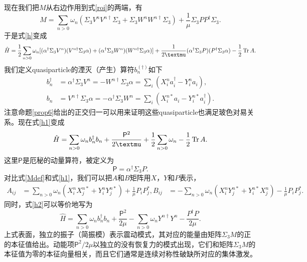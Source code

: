现在我们把$M$从右边作用到式\eqref{roi}的两端，有
\begin{equation}
  M = \sum_{n> 0} \omega_n (\Sigma_3 V^n V^{n\dagger} \Sigma_3 +\Sigma_3 W^n W^{n\dagger} \Sigma_3) +\frac{1}{\mu}\Sigma_3 PP^\dagger \Sigma_3.
\end{equation}
于是式\eqref{h}变成
\begin{equation}
  \hat H=\frac{1}{2}\sum_{n>0} \omega_n [(\alpha^\dagger \Sigma_3 V^n) (V^{n\dagger} \Sigma_3 \alpha )+(\alpha^\dagger \Sigma_3 W^n)(W^{n\dagger}\Sigma_3 \alpha)]+\frac{1}{2\mu}(\alpha^\dagger \Sigma_3 P)(P^\dagger \Sigma_3 \alpha)-\frac{1}{2}\Tr A.\label{h1}
\end{equation}
我们定义quasiparticle的湮灭（产生）算符$b^{(\dagger)}_n$如下
\begin{subequations}
    \begin{align}
        b^\dagger_n &= \alpha^\dagger \Sigma_3 V^n = -W^{n\dagger} \Sigma_3 \alpha = \sum_i (X^n_i a_i^\dagger -Y^n_i a_i),\\
        b_n &= V^{n\dagger}\Sigma_3 \alpha = -\alpha^\dagger \Sigma_3 W^n = \sum_i (X^{n*}_i a_i -Y^{n*}_i a_i^\dagger).
    \end{align}
\end{subequations}
注意命题\ref{prop6}给出的正交归一可以用来证明这些quasiparticle也满足玻色对易关系。现在式\eqref{h1}变成
\begin{equation}
  \hat H=\sum_{n>0} \omega_n b_n^\dagger b_n + \frac{\mathsf P^2}{2\mu}+\frac{1}{2}\sum_{n>0} \omega_n -\frac{1}{2}\Tr A.\label{h2}
\end{equation}
这里$\mathsf P$是厄秘的动量算符，被定义为
\begin{equation}
  \mathsf P=\alpha^\dagger \Sigma_3 P.
\end{equation}
对比式\eqref{Mdef}和式\eqref{h1}，我们可以把$A$和$B$矩阵用$X$，$Y$和$P$表示，
\begin{subequations}
    \begin{align}
        A_{ij} &=\sum_{n>0} \omega_n (X_i^n X_j^{n*} +Y_i^n Y_j^{n*}) +\frac{1}{\mu}P_i P_j^*,
        B_{ij} &= -\sum_{n>0} \omega_n (X_i^n Y_j^{n*} +Y_i^{n*}X_j^n)-\frac{1}{\mu}P_iP_j^*.
    \end{align}
\end{subequations}
同时，式\eqref{h2}可以等价地写为
\begin{equation}
  \hat H=\sum_{n>0} \omega_n b_n^\dagger b_n + \frac{\mathsf P^2}{2\mu} - \sum_{n>0} \omega_n Y^{n\dagger}Y^n-\frac{P^\dagger P}{2\mu}.
\end{equation}
上式表面，独立的振子（简振模）表示震动模式，其对应的能量由矩阵$\Sigma_3 M$的正的本征值给出。动能项$\mathsf P^2/2\mu$以独立的没有恢复力的模式出现，它们和矩阵$\Sigma_3 M$的本征值为零的本征向量相关，而且它们通常是连续对称性破缺所对应的集体激发。